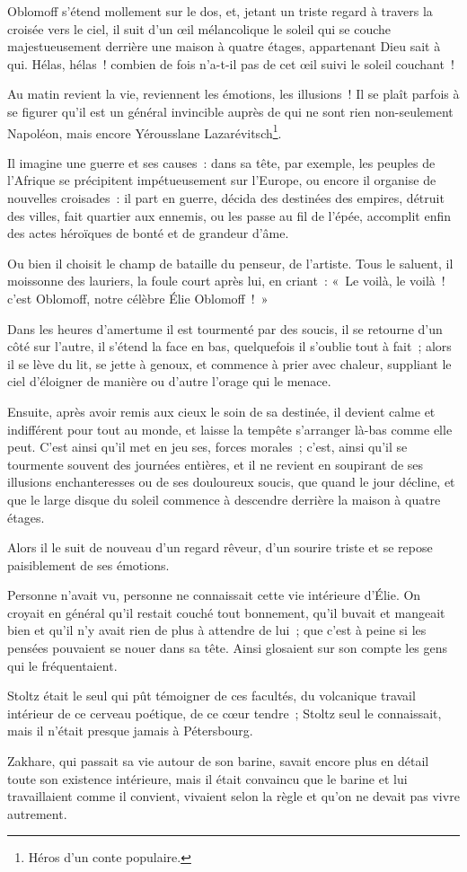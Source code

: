 \documentclass[french,twoside]{book} %
\begin{document}
Oblomoff s’étend mollement sur le dos, et, jetant un triste regard à travers la croisée vers le ciel, il suit d’un œil mélancolique le soleil qui se couche majestueusement derrière une maison à quatre étages, appartenant Dieu sait à qui. Hélas, hélas ! combien de fois n’a-t-il pas de cet œil suivi le soleil couchant !\par
Au matin revient la vie, reviennent les émotions, les illusions ! Il se plaît parfois à se figurer qu’il est un général invincible auprès de qui ne sont rien non-seulement Napoléon, mais encore Yérousslane Lazarévitsch\footnote{Héros d’un conte populaire.}.\par
Il imagine une guerre et ses causes : dans sa tête, par exemple, les peuples de l’Afrique se précipitent impétueusement sur l’Europe, ou encore il organise de nouvelles croisades : il part en guerre, décida des destinées des empires, détruit des villes, fait quartier aux ennemis, ou les passe au fil de l’épée, accomplit enfin des actes héroïques de bonté et de grandeur d’âme.\par
Ou bien il choisit le champ de bataille du penseur, de l’artiste. Tous le saluent, il moissonne des lauriers, la foule court après lui, en criant : « Le voilà, le voilà ! c’est Oblomoff, notre célèbre Élie Oblomoff ! »\par
Dans les heures d’amertume il est tourmenté par des soucis, il se retourne d’un côté sur l’autre, il s’étend la face en bas, quelquefois il s’oublie tout à fait ; alors il se lève du lit, se jette à genoux, et commence à prier avec chaleur, suppliant le ciel d’éloigner de manière ou d’autre l’orage qui le menace.\par
Ensuite, après avoir remis aux cieux le soin de sa destinée, il devient calme et indifférent pour tout au monde, et laisse la tempête s’arranger là-bas comme elle peut. C’est ainsi qu’il met en jeu ses, forces morales ; c’est, ainsi qu’il se tourmente souvent des journées entières, et il ne revient en soupirant de ses illusions enchanteresses ou de ses douloureux soucis, que quand le jour décline, et que le large disque du soleil commence à descendre derrière la maison à quatre étages.\par
Alors il le suit de nouveau d’un regard rêveur, d’un sourire triste et se repose paisiblement de ses émotions.\par
Personne n’avait vu, personne ne connaissait cette vie intérieure d’Élie. On croyait en général qu’il restait couché tout bonnement, qu’il buvait et mangeait bien et qu’il n’y avait rien de plus à attendre de lui ; que c’est à peine si les pensées pouvaient se nouer dans sa tête. Ainsi glosaient sur son compte les gens qui le fréquentaient.\par
Stoltz était le seul qui pût témoigner de ces facultés, du volcanique travail intérieur de ce cerveau poétique, de ce cœur tendre ; Stoltz seul le connaissait, mais il n’était presque jamais à Pétersbourg.\par
Zakhare, qui passait sa vie autour de son barine, savait encore plus en détail toute son existence intérieure, mais il était convaincu que le barine et lui travaillaient comme il convient, vivaient selon la règle et qu’on ne devait pas vivre autrement.
\end{document}
